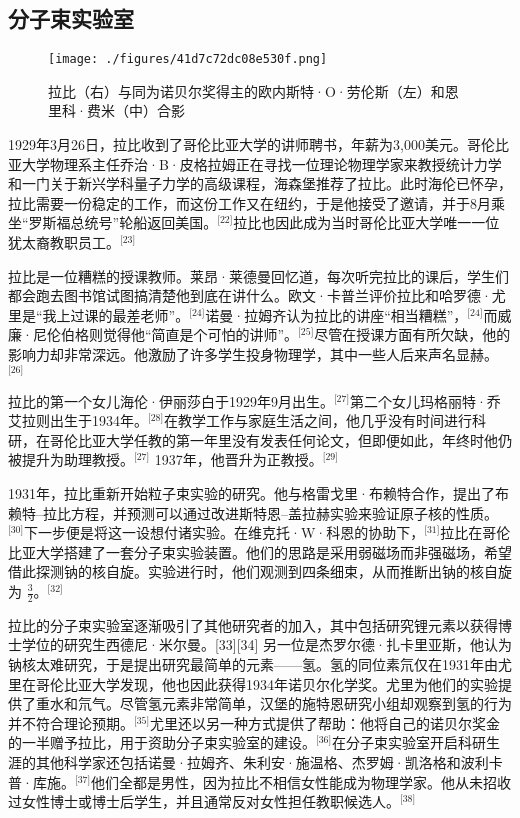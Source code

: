 \subsection{分子束实验室}
\begin{figure}[ht]
\centering
\texttt{[image: ./figures/41d7c72dc08e530f.png]}
\caption{拉比（右）与同为诺贝尔奖得主的欧内斯特·O·劳伦斯（左）和恩里科·费米（中）合影} \label{fig_YXDlb_2}
\end{figure}
1929年3月26日，拉比收到了哥伦比亚大学的讲师聘书，年薪为3,000美元。哥伦比亚大学物理系主任乔治·B·皮格拉姆正在寻找一位理论物理学家来教授统计力学和一门关于新兴学科量子力学的高级课程，海森堡推荐了拉比。此时海伦已怀孕，拉比需要一份稳定的工作，而这份工作又在纽约，于是他接受了邀请，并于8月乘坐“罗斯福总统号”轮船返回美国。\(^\text{[22]}\)拉比也因此成为当时哥伦比亚大学唯一一位犹太裔教职员工。\(^\text{[23]}\)

拉比是一位糟糕的授课教师。莱昂·莱德曼回忆道，每次听完拉比的课后，学生们都会跑去图书馆试图搞清楚他到底在讲什么。欧文·卡普兰评价拉比和哈罗德·尤里是“我上过课的最差老师”。\(^\text{[24]}\)诺曼·拉姆齐认为拉比的讲座“相当糟糕”，\(^\text{[24]}\)而威廉·尼伦伯格则觉得他“简直是个可怕的讲师”。\(^\text{[25]}\)尽管在授课方面有所欠缺，他的影响力却非常深远。他激励了许多学生投身物理学，其中一些人后来声名显赫。\(^\text{[26]}\)

拉比的第一个女儿海伦·伊丽莎白于1929年9月出生。\(^\text{[27]}\)第二个女儿玛格丽特·乔艾拉则出生于1934年。\(^\text{[28]}\)在教学工作与家庭生活之间，他几乎没有时间进行科研，在哥伦比亚大学任教的第一年里没有发表任何论文，但即便如此，年终时他仍被提升为助理教授。\(^\text{[27]}\) 1937年，他晋升为正教授。\(^\text{[29]}\)

1931年，拉比重新开始粒子束实验的研究。他与格雷戈里·布赖特合作，提出了布赖特–拉比方程，并预测可以通过改进斯特恩–盖拉赫实验来验证原子核的性质。\(^\text{[30]}\)下一步便是将这一设想付诸实验。在维克托·W·科恩的协助下，\(^\text{[31]}\)拉比在哥伦比亚大学搭建了一套分子束实验装置。他们的思路是采用弱磁场而非强磁场，希望借此探测钠的核自旋。实验进行时，他们观测到四条细束，从而推断出钠的核自旋为 $\frac{3}{2}$。\(^\text{[32]}\)

拉比的分子束实验室逐渐吸引了其他研究者的加入，其中包括研究锂元素以获得博士学位的研究生西德尼·米尔曼。[33][34] 另一位是杰罗尔德·扎卡里亚斯，他认为钠核太难研究，于是提出研究最简单的元素——氢。氢的同位素氘仅在1931年由尤里在哥伦比亚大学发现，他也因此获得1934年诺贝尔化学奖。尤里为他们的实验提供了重水和氘气。尽管氢元素非常简单，汉堡的施特恩研究小组却观察到氢的行为并不符合理论预期。\(^\text{[35]}\)尤里还以另一种方式提供了帮助：他将自己的诺贝尔奖金的一半赠予拉比，用于资助分子束实验室的建设。\(^\text{[36]}\)在分子束实验室开启科研生涯的其他科学家还包括诺曼·拉姆齐、朱利安·施温格、杰罗姆·凯洛格和波利卡普·库施。\(^\text{[37]}\)他们全都是男性，因为拉比不相信女性能成为物理学家。他从未招收过女性博士或博士后学生，并且通常反对女性担任教职候选人。\(^\text{[38]}\)

